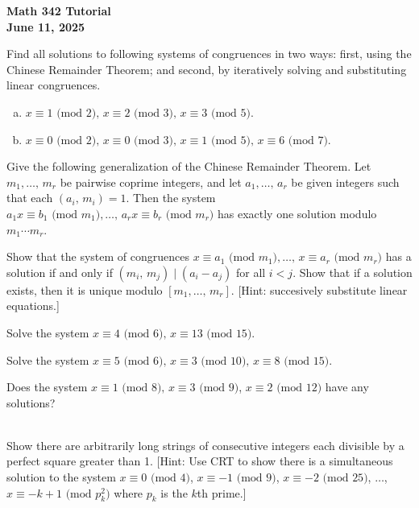\documentclass[a4paper,11pt]{article}
\theoremstyle{mythm}
\theoremstyle{mydef}
\renewcommand{\pmod}[1]{\text{ (mod $#1$)}}
\begin{document}
\begin{center}
  {\Large\bfseries Math 342 Tutorial} \\
  {\normalsize\bf June 11, 2025}
\end{center}

 Find all solutions to following systems of
congruences in two ways: first, using the Chinese Remainder Theorem; and second,
by iteratively solving and substituting linear congruences.

\begin{enumerate}[(a)]
\item $x \equiv 1 \pmod{2},\, x \equiv 2 \pmod{3},\, x \equiv 3 \pmod{5}$.
\item $x \equiv 0 \pmod{2},\, x \equiv 0 \pmod{3},\, x \equiv 1 \pmod{5},\, x
  \equiv 6 \pmod{7}$.
\end{enumerate}

 Give the following generalization of the Chinese
Remainder Theorem. Let $m_1,\dots,\,m_r$ be pairwise coprime integers, and let
$a_1,\dots,\,a_r$ be given integers such that each $(a_i,\,m_i)=1$. Then the
system $a_1x \equiv b_1 \pmod{m_1}, \dots,\, a_rx \equiv b_r \pmod{m_r}$ has
exactly one solution modulo $m_1 \cdots m_r$. \\

\begin{enumerate*}[(a)]
\item Show that the system of congruences $x \equiv a_1 \pmod{m_1}, \dots,\, x
  \equiv a_r \pmod{m_r}$ has a solution if and only if $(m_i,\,m_j) \mid
  (a_i-a_j)$ for all $i<j$. Show that if a solution exists, then it is unique
  modulo $[m_1,\dots,\,m_r]$. [Hint: succesively substitute linear equations.]
\item Solve the system $x \equiv 4 \pmod{6},\, x \equiv 13 \pmod{15}$.
\item Solve the system $x \equiv 5 \pmod{6},\, x \equiv 3 \pmod{10},\, x \equiv
  8 \pmod{15}$.
\item Does the system $x \equiv 1 \pmod{8},\, x \equiv 3 \pmod{9}$, $x \equiv 2
  \pmod{12}$ have any solutions?
\end{enumerate*} \\

 Show there are arbitrarily long strings of
consecutive integers each divisible by a perfect square greater than 1. [Hint:
Use CRT to show there is a simultaneous solution to the system $x \equiv 0
\pmod{4}$, $x \equiv -1 \pmod{9}$, $x \equiv -2 \pmod{25}$, $\dots$, $x \equiv
-k+1 \pmod{p_k^2}$ where $p_k$ is the $k$th prime.] \\
\end{document}
